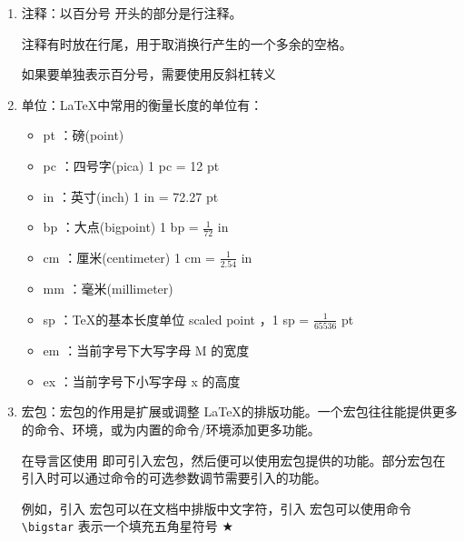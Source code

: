 \begin{enumerate}
\verb|\LaTeX| 命令用于输出一个特殊的符号 \LaTeX ，像这样表示符号的命令还有很多。

\item 注释：以百分号 \boxforcmdbox{\lstinline[language=Python]|\%|} 开头的部分是行注释。

注释有时放在行尾，用于取消换行产生的一个多余的空格。

如果要单独表示百分号，需要使用反斜杠转义 \boxforcmdbox{\vphantom{f}\textbackslash\lstinline[language=Python]|\%|}

\item 单位：\LaTeX 中常用的衡量长度的单位有：

\begin{itemize}
    \item pt ：磅(point)
    \item pc ：四号字(pica) 1 pc = 12 pt
    \item in ：英寸(inch) 1 in = 72.27 pt 
    \item bp ：大点(bigpoint) 1 bp = $\displaystyle{\frac{1}{72}}$ in 
    \item cm ：厘米(centimeter) 1 cm = $\displaystyle{\frac{1}{2.54}}$ in
    \item mm ：毫米(millimeter)
    \item sp ：\TeX 的基本长度单位 scaled point ，1 sp = $\displaystyle{\frac{1}{65536}}$ pt
    \item em ：当前字号下大写字母 M 的宽度
    \item ex ：当前字号下小写字母 x 的高度
\end{itemize}

\item 宏包：宏包的作用是扩展或调整 \LaTeX 的排版功能。一个宏包往往能提供更多的命令、环境，或为内置的命令/环境添加更多功能。

在导言区使用 \boxforcmd{\\usepackage{}} 即可引入宏包，然后便可以使用宏包提供的功能。部分宏包在引入时可以通过命令的可选参数调节需要引入的功能。

例如，引入  宏包可以在文档中排版中文字符，引入  宏包可以使用命令 \verb|\bigstar| 表示一个填充五角星符号 $\bigstar$



\end{enumerate}
